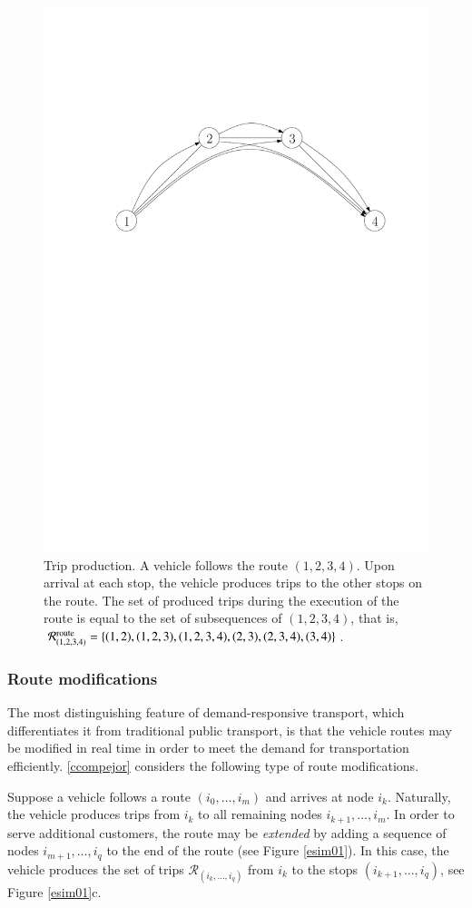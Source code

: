 \documentclass[dissertation,draft*]{aaltoseries}
\begin{document}
\begin{figure}[ht]
\begin{center}
\includegraphics[width=0.7\columnwidth]{esim02}
\caption{Trip production. A vehicle follows the route $(1,2,3,4)$. Upon arrival at each stop, the
vehicle produces trips to the other stops on the route. The
set of produced trips during the execution of the route is equal to the set of subsequences of $(1,2,3,4)$, that is, 
$\mathcal{R}_{(1,2,3,4)}^{\rm route} = \{(1,2),(1,2,3),(1,2,3,4),(2,3),(2,3,4),(3,4)\}$.
}
\label{esim02}
\end{center}
\end{figure}


\subsubsection{Route modifications}
\label{routemodifications}
The most distinguishing feature of demand-responsive transport, which differentiates it from 
traditional public transport, is that the vehicle routes may be modified in
real time in order to meet the demand for transportation efficiently.
\ref{ccompejor} considers the following type of route modifications.

Suppose a vehicle follows a route $(i_0,\ldots,i_m)$ and arrives at node $i_k$.
Naturally, the vehicle produces trips from $i_k$ to all remaining nodes $i_{k+1},\ldots,i_m$.
In order to serve additional customers, the route may be
\emph{extended} by adding a sequence of nodes $i_{m+1},\ldots,i_q$ to 
the end of the route (see Figure \ref{esim01}). In this case, the vehicle produces the set of trips 
$\mathcal{R}_{(i_k,\ldots, i_q)}$
from $i_k$ to the stops $(i_{k+1},\ldots,i_q)$, see Figure \ref{esim01}c.
\end{document}
